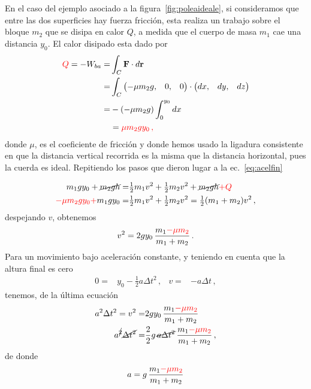 En el caso del ejemplo asociado a la figura~\ref{fig:poleaideale}, si consideramos que entre las dos superficies hay fuerza fricción, esta realiza un trabajo sobre el bloque $m_2$ que se disipa en calor $Q$, a medida que el cuerpo de masa $m_1$ cae una distancia $y_0$. El calor disipado esta dado por
\begin{align*}
    {\color{red}Q}=-W_{ba}=&\int_C \mathbf{F}\cdot d\mathbf{r}\nonumber\\
=&\int_C
\begin{pmatrix}
  -\mu m_2g,&0,&0
\end{pmatrix}\cdot
\begin{pmatrix}
dx,&dy,&dz  
\end{pmatrix}\nonumber\\
=&-(-\mu m_2 g)\int_0^{y_0}dx\nonumber\\
&={\color{red}\mu m_2g y_0\,,}
\end{align*}
donde $\mu$, es el coeficiente de fricción y donde hemos usado la
ligadura consistente en que la distancia vertical recorrida es la
misma que la distancia horizontal, pues la cuerda es ideal.
Repitiendo los pasos que dieron lugar a la ec.~\eqref{eq:acelfin}


\begin{frame}
\begin{align*}
  m_1gy_0+\cancel{m_2gh}=&\tfrac{1}{2}m_1 v^2+\tfrac{1}{2}m_2 v^2+\cancel{m_2gh}{\color{red}+Q}\nonumber\\
 {\color{red}-\mu m_2 g y_0+}m_1gy_0=&\tfrac{1}{2}m_1 v^2+\tfrac{1}{2}m_2 v^2
  =\tfrac{1}{2}(m_1+m_2) v^2\,,
\end{align*}
despejando $v$, obtenemos
\begin{align*}
  v^2=2gy_0\,\frac{m_1{\color{red}-\mu m_2}}{m_1+m_2}\,.
\end{align*}
Para un movimiento bajo aceleración constante, y teniendo en cuenta que la altura final es cero
\begin{align*}
  0=&y_0-\tfrac{1}{2}a\Delta t^2\,,&
  v=&-a\Delta t\,,
\end{align*}
tenemos, de la última ecuación
\begin{align*}
  a^2 \Delta t^2=v^2
  =&2gy_0\,\frac{m_1{\color{red}-\mu m_2}}{m_1+m_2}\nonumber\\
  a^{\cancel{2}} \cancel{\Delta t^2}=&\frac{2}{2}g\,\cancel{a\Delta t^2}\,\frac{m_1{\color{red}-\mu m_2}}{m_1+m_2}\,,
\end{align*}
de donde
\begin{align}
\label{eq:acelfinmu}
  a=g\,\frac{m_1{\color{red}-\mu m_2}}{m_1+m_2}
\end{align}

\end{frame}

